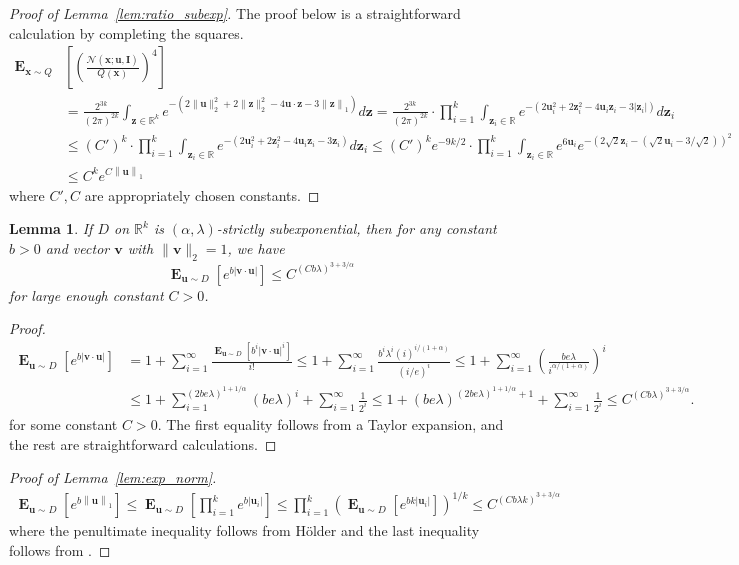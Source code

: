\documentclass[10pt,a4paper]{article}
\newtheorem{lemma}{Lemma}[section]
\newcommand\twonorm[1]{\|#1\|_2}
\newcommand\norm[1]{\left\| #1 \right\|}
\renewcommand\vec[1]{\mathbf{#1}}
\DeclareMathOperator*{\E}{\mathbf{E}}
\newcommand{\R}{\mathbb{R}}
\newcommand{\1}{\Ind}
\newcommand{\x}{\vec x}
\newcommand{\vv}{\vec v}
\newcommand{\vu}{\vec u}
\newcommand{\z}{\vec z}
\begin{document}
\begin{proof}[Proof of Lemma~\ref{lem:ratio_subexp}]
\label{proof:ratio_subexp}
The proof below is a straightforward calculation by completing the squares.
    \begin{align*}
        \E_{\x\sim Q}&\left[\left(\frac{\mathcal{N}(\x; \vu, \vec I)}{
             Q(\x)}\right)^4\right] \\&=\frac{2^{3k}}{{(2\pi)}^{2k}}\int_{\z\in \R^k}e^{-(2\twonorm{\vu}^2+2\twonorm{\z}^2-4\vu\cdot \z-3\norm{\z}_1)} d\z
            =\frac{2^{3k}}{(2\pi)^{2k}}\cdot\prod_{i=1}^{k}\int_{\z_i\in \R}e^{-(2\vu_i^2+2\z_i^2-4\vu_i\z_i-3|\z_i|)} d\z_i\\
            &\leq (C')^{k}\cdot \prod_{i=1}^{k}\int_{\z_i\in \R}e^{-(2\vu_i^2+2\z_i^2-4\vu_i\z_i-3\z_i)} d\z_i
            \leq (C')^ke^{-9k/2}\cdot \prod_{i=1}^{k}\int_{\z_i\in \R} e^{6\vu_i}e^{-(2\sqrt{2}\z_i-(\sqrt{2}{\vu_i}-3/\sqrt{2}))^2}\\
            &\leq C^ke^{C\norm{\vu}_1}
    \end{align*}
    where $C',C$ are appropriately chosen constants. 
\end{proof} 
\begin{lemma}
    \label{lem:exp_ip}
    If $D$ on $\R^k$ is $(\alpha,\lambda)$-strictly subexponential, then for any constant $b>0$ and vector $\vv$ with $\twonorm{\vv}=1$, we have 
    \[
      \E_{\vu\sim D}\left[e^{b|\vv\cdot \vu|  }\right]\leq C^{(Cb\lambda)^{3+3/\alpha}}
    \] for large enough constant $C>0$.
\end{lemma}
\begin{proof}
    \begin{align*}
        \E_{\vu\sim D}\left[e^{b|\vv\cdot \vu|  }\right]&=1+\sum_{i=1}^{\infty}\frac{\E_{\vu\sim D}\left[b^i|\vv\cdot \vu|^i\right]}{i!}
        \leq 1+\sum_{i=1}^{\infty}\frac{b^i\lambda^i (i)^{i/(1+\alpha)}}{(i/e)^i}
        \leq 1+\sum_{i=1}^{\infty}\left(\frac{be\lambda}{i^{\alpha/(1+\alpha)}}\right)^i\\
        &\leq 1+\sum_{i=1}^{(2be\lambda)^{1+1/\alpha}}(be\lambda)^i+\sum_{i=1}^{\infty}\frac{1}{2^i}\leq  1+(be\lambda)^{(2be\lambda)^{1+1/\alpha}+1}+\sum_{i=1}^{\infty}\frac{1}{2^i}
        \leq  C^{(Cb\lambda)^{3+3/\alpha}}.
    \end{align*} for some constant $C>0$. The first equality follows from a Taylor expansion, and the rest are straightforward calculations.
\end{proof}

\begin{proof}[Proof of Lemma~\ref{lem:exp_norm}]
\label{proof:exp_norm}
    \begin{align*}
        \E_{\vu\sim D}\left[e^{b\norm{\vu}_1}\right ] \leq \E_{\vu\sim D}\left[\prod_{i=1}^{k}e^{b|\vu_i|}\right]
        \leq \prod_{i=1}^{k}\left(\E_{\vu\sim D}\left[e^{bk|\vu_i|}\right]\right)^{1/k}
        \leq C^{\left(Cb\lambda k\right)^{3+3/\alpha}}
    \end{align*}
    where the penultimate inequality follows from H{\"o}lder and the last inequality follows from .
\end{proof}
\end{document}

